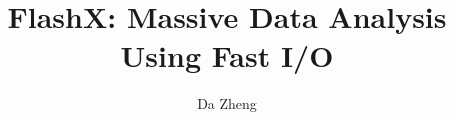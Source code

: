 \documentclass[12pt,oneside,final]{thesis}
\begin{document}
\title{FlashX: Massive Data Analysis Using Fast I/O}
\author{Da Zheng}
\dissertation
\doctorphilosophy
\copyrightnotice










%





\begin{vita}



\end{vita}
\end{document}
